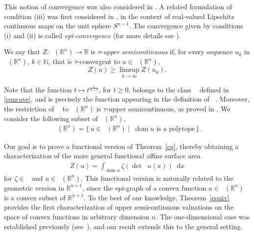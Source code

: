\documentclass[11pt]{article}
\theoremstyle{definition} %
\newcommand{\dif}{\mathop{}\!\mathrm{d}}
\newcommand{\RR}{(\mathbb{R}^n)}
\DeclareMathOperator{\dom}{dom}
\DeclareMathOperator{\D}{D^2}
\DeclareMathOperator{\LC}{Conv_{ld}}
\DeclareMathOperator{\LP}{Conv_{lp}}
\DeclareMathOperator{\fas}{\Omega_{func}}
\DeclareMathOperator{\conc}{Conc([0,\infty))}
\begin{document}
\noindent This notion of convergence was also considered in \cite{baeta1d,baetaludwigsemicontinuity}. A related formulation of condition (iii) was first considered in \cite{colesanti2020invariant, colesanti2021continuous}, in the context of real-valued Lipschitz continuous maps on the unit sphere $S^{n-1}$. The convergence given by conditions (i) and (ii) is called \textit{epi-convergence} (for more details see  \cite{rockafellar2009variational}).


We say that  $Z:\LC\RR\rightarrow \mathbb{R}$ is  $\tau$-\textit{upper semicontinuous}  if, for every sequence $u_k$ in $\LC\RR$, $k\in\mathbb{N}$,  that is  $\tau$-convergent   to $u\in \LC\RR$,
$$Z(u)\geq \limsup_{k\rightarrow \infty}Z(u_k).$$ 



Note that the function $t \mapsto t^{\frac{1}{n+2}}$, for $t \ge 0$, belongs to the class $\conc$ defined in \eqref{concave}, and is precisely the function appearing in the definition of $\fas$. Moreover, the restriction of $\fas$ to $\LC(\mathbb{R}^n)$ is $\tau$-upper semicontinuous, as proved in \cite[Theorem~1]{baetaludwigsemicontinuity}. We consider the following subset of $\LC(\mathbb{R}^n)$,
\begin{align*}
   \LP(\mathbb{R}^n) = \{\, u \in \LC(\mathbb{R}^n) \mid \ \dom u \text{ is a polytope} \,\}.
\end{align*}
  


Our goal is to prove a functional version of Theorem~\ref{cg}, thereby obtaining a characterization of the more general functional affine surface area
\begin{align}\label{int}
Z(u) = \int_{\dom u} \zeta(\det \D u(x))\dif x
\end{align}
for $\zeta \in \conc$ and $u \in \LP\RR$. This functional version is naturally related to the geometric version in $\mathbb{R}^{n+1}$, since the epi-graph of a convex function $u \in \LP\RR$ is a convex subset of $\mathbb{R}^{n+1}$. To the best of our knowledge, Theorem~\ref{equiv} provides the first characterization of upper semicontinuous valuations on the space of convex functions in arbitrary dimension $n$. The one-dimensional case was established previously (see~\cite{baeta1d}), and our result extends this to the general setting.
\end{document}
